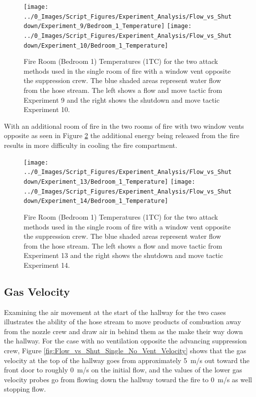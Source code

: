 \documentclass[12pt,oneside]{book}
\begin{document}
\begin{figure}[H]
\centering
\texttt{[image: ../0\_Images/Script\_Figures/Experiment\_Analysis/Flow\_vs\_Shutdown/Experiment\_9/Bedroom\_1\_Temperature]}
\texttt{[image: ../0\_Images/Script\_Figures/Experiment\_Analysis/Flow\_vs\_Shutdown/Experiment\_10/Bedroom\_1\_Temperature]}
\caption[Bedroom 1 Temp. - Single Vent - Flow \& Move vs. Shutdown \& Move]{Fire Room (Bedroom 1) Temperatures (1TC) for the two attack methods used in the single room of fire with a window vent opposite the suppression crew. The blue shaded areas represent water flow from the hose stream. The left shows a flow and move tactic from Experiment 9 and the right shows the shutdown and move tactic Experiment 10.}
\label{fig:Flow_vs_Shut_Single_Vent_Fire_Temp}
\end{figure}

With an additional room of fire in the two rooms of fire with two window vents opposite as seen in Figure \ref{fig:Flow_vs_Shut_Two_Vent_Fire_Temp} the additional energy being released from the fire results in more difficulty in cooling the fire compartment.  

\begin{figure}[H]
\centering
\texttt{[image: ../0\_Images/Script\_Figures/Experiment\_Analysis/Flow\_vs\_Shutdown/Experiment\_13/Bedroom\_1\_Temperature]}
\texttt{[image: ../0\_Images/Script\_Figures/Experiment\_Analysis/Flow\_vs\_Shutdown/Experiment\_14/Bedroom\_1\_Temperature]}
\caption[Bedroom 1 Temp. - Two Vent - Flow \& Move vs. Shutdown \& Move]{Fire Room (Bedroom 1) Temperatures (1TC) for the two attack methods used in the single room of fire with a window vent opposite the suppression crew. The blue shaded areas represent water flow from the hose stream. The left shows a flow and move tactic from Experiment 13 and the right shows the shutdown and move tactic Experiment 14.}
\label{fig:Flow_vs_Shut_Two_Vent_Fire_Temp}
\end{figure}

\subsection{Gas Velocity}
Examining the air movement at the start of the hallway for the two cases illustrates the ability of the hose stream to move products of combustion away from the nozzle crew and draw air in behind them as the make their way down the hallway. For the case with no ventilation opposite the advancing suppression crew, Figure \ref{fig:Flow_vs_Shut_Single_No_Vent_Velocity} shows that the gas velocity at the top of the hallway goes from approximately 5~m/s out toward the front door to roughly 0~m/s on the initial flow, and the values of the lower gas velocity probes go from flowing down the hallway toward the fire to 0~m/s as well stopping flow. 
\end{document}
